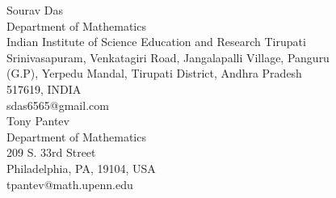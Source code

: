 \documentclass[11pt]{amsart}
\theoremstyle{plain}
\numberwithin{equation}{section}
\theoremstyle{definition}
\theoremstyle{plain}
\begin{document}
\noindent
Sourav Das \\
Department of Mathematics\\
Indian Institute of Science Education and Research Tirupati\\
Srinivasapuram, Venkatagiri Road, Jangalapalli Village, Panguru\\ (G.P), Yerpedu Mandal, Tirupati District, Andhra Pradesh\\
517619, INDIA\\
sdas6565@gmail.com\\ 

\noindent
Tony Pantev \\
Department of Mathematics \\
209 S. 33rd Street \\
Philadelphia, PA, 19104, USA \\
tpantev@math.upenn.edu
\end{document}
